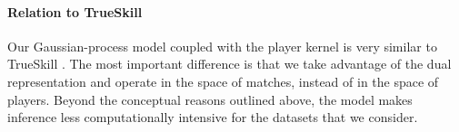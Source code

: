 \paragraph{Relation to TrueSkill}
Our Gaussian-process model coupled with the player kernel is very similar to TrueSkill \citep{herbrich2006trueskill}.
The most important difference is that we take advantage of the dual representation and operate in the space of matches, instead of in the space of players.
Beyond the conceptual reasons outlined above, the model makes inference less computationally intensive for the datasets that we consider.
